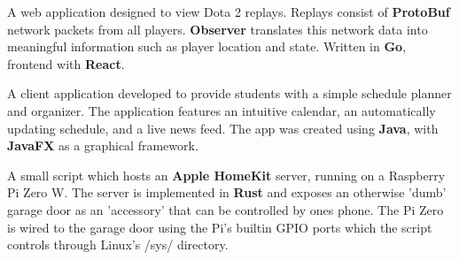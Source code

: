 \documentclass[9pt,letter,normalphoto]{altacv}
\begin{document}
  A web application designed to view Dota 2 replays. Replays consist of \textbf{ProtoBuf} network packets from all players. \textbf{Observer} translates this network data into meaningful information such as player location and state. Written in \textbf{Go}, frontend with \textbf{React}.
  
  \divider
  A client application developed to provide students with a simple schedule planner and organizer.
  The application features an intuitive calendar, an automatically updating schedule, and a live news feed.
  The app was created using \textbf{Java}, with \textbf{JavaFX} as a graphical framework.

   A small script which hosts an \textbf{Apple HomeKit} server, running on a Raspberry Pi Zero W. The server is implemented in \textbf{Rust} and exposes an otherwise 'dumb' garage door as an 'accessory' that can be controlled by ones phone. The Pi Zero is wired to the garage door using the Pi's builtin GPIO ports which the script controls through Linux's /sys/ directory.
  



\medskip
\end{document}
